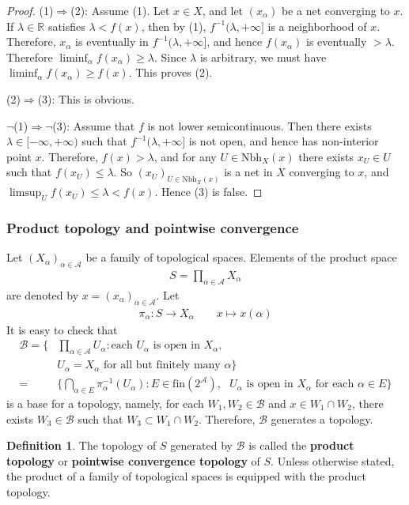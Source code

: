 \documentclass[12pt,b5paper,notitlepage]{article}
\theoremstyle{definition}
\newtheorem{df}{Definition}[subsection]
\theoremstyle{plain}
\newcommand{\mc}{\mathcal}
\newcommand{\scr}{\mathscr}
\newcommand{\Rbb}{\mathbb R}
\newcommand{\fin}{\mathrm{fin}}
\newcommand{\Nbh}{\mathrm{Nbh}}
\numberwithin{equation}{section}
\begin{document}
\begin{proof}
(1)$\Rightarrow$(2): Assume (1). Let $x\in X$, and let $(x_\alpha)$ be a net converging to $x$. If $\lambda\in\Rbb$ satisfies $\lambda<f(x)$, then by (1), $f^{-1}(\lambda,+\infty]$ is a neighborhood of $x$. Therefore, $x_\alpha$ is eventually in $f^{-1}(\lambda,+\infty]$, and hence $f(x_\alpha)$ is eventually $>\lambda$. Therefore $\liminf_\alpha f(x_\alpha)\geq\lambda$. Since $\lambda$ is arbitrary, we must have $\liminf_\alpha f(x_\alpha)\geq f(x)$. This proves (2).

(2)$\Rightarrow$(3): This is obvious.

$\neg$(1)$\Rightarrow$$\neg$(3): Assume that $f$ is not lower semicontinuous. Then there exists $\lambda\in[-\infty,+\infty)$ such that $f^{-1}(\lambda,+\infty]$ is not open, and hence has non-interior point $x$. Therefore, $f(x)>\lambda$, and for any $U\in\Nbh_X(x)$ there exists $x_U\in U$ such that $f(x_U)\leq\lambda$. So $(x_U)_{U\in\Nbh_X(x)}$ is a net in $X$ converging to $x$, and $\limsup_U f(x_U)\leq\lambda<f(x)$. Hence (3) is false. 
\end{proof}







\subsubsection{Product topology and pointwise convergence}

Let $(X_\alpha)_{\alpha\in\scr A}$ be a family of topological spaces. Elements of the product space
\begin{align*}
S=\prod_{\alpha\in\scr A}X_\alpha
\end{align*}
are denoted by $x=(x_\alpha)_{\alpha\in\scr A}$. Let
\begin{align*}
\pi_\alpha:S\rightarrow X_\alpha\qquad x\mapsto x(\alpha)
\end{align*}
It is easy to check that
\begin{align*}
\mc B=\Big\{&\prod_{\alpha\in\scr A} U_\alpha: \text{each $U_\alpha$ is open in $X_\alpha$},\\
& \text{$U_\alpha=X_\alpha$ for all but finitely many $\alpha$}\Big\}\\
=&\Big\{\bigcap_{\alpha\in E} \pi_\alpha^{-1}(U_\alpha):E\in\fin(2^{\scr A}), \text{ $U_\alpha$ is open in $X_\alpha$ for each $\alpha\in E$}    \Big\}
\end{align*}
is a base for a topology, namely, for each $W_1,W_2\in\mc B$ and $x\in W_1\cap W_2$, there exists $W_3\in\mc B$ such that $W_3\subset W_1\cap W_2$. Therefore, $\mc B$ generates a topology.
\begin{df}
The topology of $S$ generated by $\mc B$ is called the \textbf{product topology}  or \textbf{pointwise convergence topology}  of $S$. Unless otherwise stated, the product of a family of topological spaces is equipped with the product topology.
\end{df}
\end{document}
